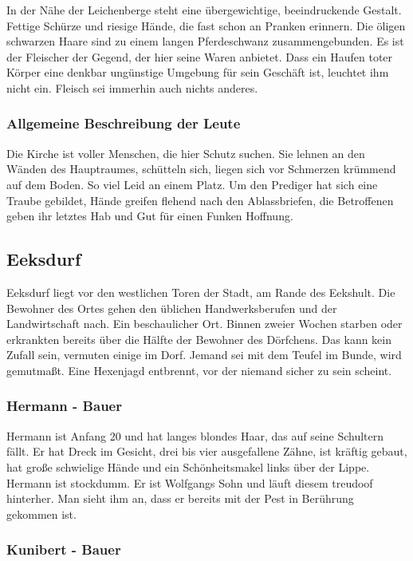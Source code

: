 In der Nähe der Leichenberge steht eine übergewichtige, beeindruckende Gestalt. Fettige Schürze und riesige Hände, die fast schon an Pranken erinnern. Die öligen schwarzen Haare sind zu einem langen Pferdeschwanz zusammengebunden. Es ist der Fleischer der Gegend, der hier seine Waren anbietet. Dass ein Haufen toter Körper eine denkbar ungünstige Umgebung für sein Geschäft ist, leuchtet ihm nicht ein. Fleisch sei immerhin auch nichts anderes.

\subsubsection*{Allgemeine Beschreibung der Leute}
\label{Leute}

Die Kirche ist voller Menschen, die hier Schutz suchen. Sie lehnen an den Wänden des Hauptraumes, schütteln sich, liegen sich vor Schmerzen krümmend auf dem Boden. So viel Leid an einem Platz. Um den Prediger hat sich eine Traube gebildet, Hände greifen flehend nach den Ablassbriefen, die Betroffenen geben ihr letztes Hab und Gut für einen Funken Hoffnung.


\subsection{Eeksdurf}

Eeksdurf liegt vor den westlichen Toren der Stadt, am Rande des Eekshult. Die Bewohner des Ortes gehen den üblichen Handwerksberufen und der Landwirtschaft nach. Ein beschaulicher Ort. Binnen zweier Wochen starben oder erkrankten bereits über die Hälfte der Bewohner des Dörfchens. Das kann kein Zufall sein, vermuten einige im Dorf. Jemand sei mit dem Teufel im Bunde, wird gemutmaßt. Eine Hexenjagd entbrennt, vor der niemand sicher zu sein scheint.

\subsubsection*{Hermann - Bauer}
\label{Hermann}

Hermann ist Anfang 20 und hat langes blondes Haar, das auf seine Schultern fällt. Er hat Dreck im Gesicht, drei bis vier ausgefallene Zähne, ist kräftig gebaut, hat große schwielige Hände und ein Schönheitsmakel links über der Lippe. Hermann ist stockdumm. Er ist Wolfgangs Sohn und läuft diesem treudoof hinterher. Man sieht ihm an, dass er bereits mit der Pest in Berührung gekommen ist.

\subsubsection*{Kunibert - Bauer}
\label{Kunibert}

